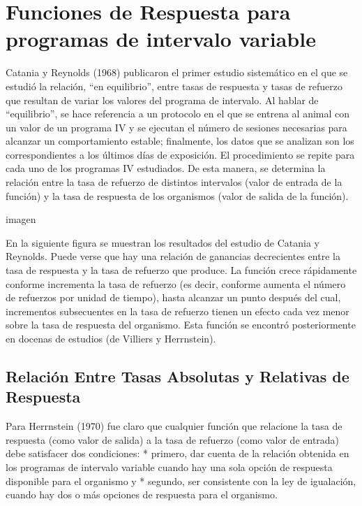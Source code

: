\documentclass[
  a4paper,
  DIV=11,
  numbers=noendperiod]{scrreprt}
\begin{document}
\section{Funciones de Respuesta para programas de intervalo
variable}\label{funciones-de-respuesta-para-programas-de-intervalo-variable}

Catania y Reynolds (1968) publicaron el primer estudio sistemático en el
que se estudió la relación, ``en equilibrio'', entre tasas de respuesta
y tasas de refuerzo que resultan de variar los valores del programa de
intervalo. Al hablar de ``equilibrio'', se hace referencia a un
protocolo en el que se entrena al animal con un valor de un programa IV
y se ejecutan el número de sesiones necesarias para alcanzar un
comportamiento estable; finalmente, los datos que se analizan son los
correspondientes a los últimos días de exposición. El procedimiento se
repite para cada uno de los programas IV estudiados. De esta manera, se
determina la relación entre la tasa de refuerzo de distintos intervalos
(valor de entrada de la función) y la tasa de respuesta de los
organismos (valor de salida de la función).

imagen

En la siguiente figura se muestran los resultados del estudio de Catania
y Reynolds. Puede verse que hay una relación de ganancias decrecientes
entre la tasa de respuesta y la tasa de refuerzo que produce. La función
crece rápidamente conforme incrementa la tasa de refuerzo (es decir,
conforme aumenta el número de refuerzos por unidad de tiempo), hasta
alcanzar un punto después del cual, incrementos subsecuentes en la tasa
de refuerzo tienen un efecto cada vez menor sobre la tasa de respuesta
del organismo. Esta función se encontró posteriormente en docenas de
estudios (de Villiers y Herrnstein).

\subsection{Relación Entre Tasas Absolutas y Relativas de
Respuesta}\label{relaciuxf3n-entre-tasas-absolutas-y-relativas-de-respuesta}

Para Herrnstein (1970) fue claro que cualquier función que relacione la
tasa de respuesta (como valor de salida) a la tasa de refuerzo (como
valor de entrada) debe satisfacer dos condiciones: * primero, dar cuenta
de la relación obtenida en los programas de intervalo variable cuando
hay una sola opción de respuesta disponible para el organismo y *
segundo, ser consistente con la ley de igualación, cuando hay dos o más
opciones de respuesta para el organismo.
\end{document}
